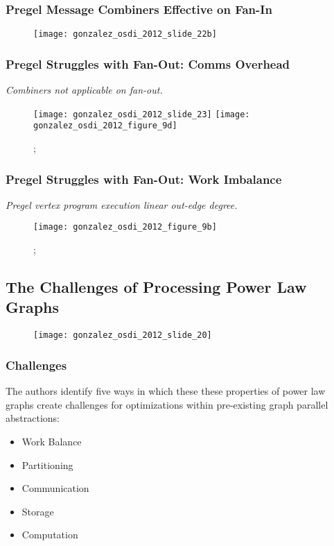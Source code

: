 \begin{frame}
  \frametitle{Pregel Message Combiners Effective on Fan-In}
  \begin{figure}
    \centering
    \texttt{[image: gonzalez\_osdi\_2012\_slide\_22b]}
    \caption{\cite[OSDI '12 Slides]{gonzalez2012powergraph-slides}}
  \end{figure}
\end{frame}

\begin{frame}
  \frametitle{Pregel Struggles with Fan-Out: Comms Overhead}
  \centering
  \large{\textit{Combiners not applicable on fan-out.}}
  \begin{figure}
    \texttt{[image: gonzalez\_osdi\_2012\_slide\_23]}
    \texttt{[image: gonzalez\_osdi\_2012\_figure\_9d]}
    \caption{\cite[OSDI '12 Slides]{gonzalez2012powergraph-slides};
    \cite[OSDI '12]{gonzalez2012powergraph}}
  \end{figure}
\end{frame}

\begin{frame}
  \frametitle{Pregel Struggles with Fan-Out: Work Imbalance}
  \centering
  \large
  \textit{Pregel vertex program execution linear out-edge degree.}

  \begin{figure}
    \texttt{[image: gonzalez\_osdi\_2012\_figure\_9b]}
    \caption{\cite[OSDI '12 Slides]{gonzalez2012powergraph-slides};
    \cite[OSDI '12]{gonzalez2012powergraph}}
  \end{figure}
\end{frame}


\subsection{The Challenges of Processing Power Law Graphs}

\begin{frame}
  \begin{figure}
    \centering
    \texttt{[image: gonzalez\_osdi\_2012\_slide\_20]}
    \caption{\cite[OSDI '12]{gonzalez2012powergraph-slides}}
  \end{figure}
\end{frame}

\begin{frame}
  \frametitle{Challenges}
  The authors identify five ways in which these these properties of power law
  graphs create challenges for optimizations within pre-existing graph parallel
  abstractions:
  \begin{itemize}
    \item Work Balance
    \item Partitioning
    \item Communication
    \item Storage
    \item Computation
  \end{itemize}
\end{frame}
